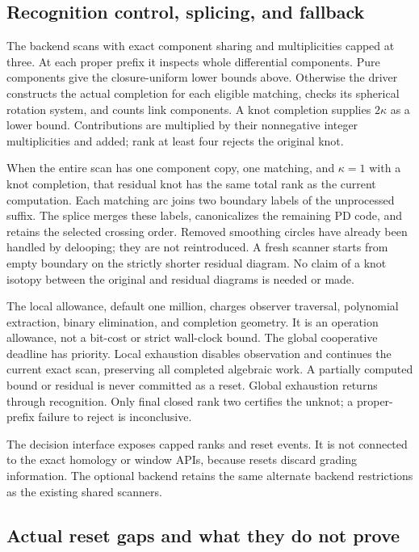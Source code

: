 \subsection{Recognition control, splicing, and fallback}

The backend scans with exact component sharing and multiplicities capped
at three.  At each proper prefix it inspects whole differential components.
Pure components give the closure-uniform lower bounds above.  Otherwise
the driver constructs the actual completion for each eligible matching,
checks its spherical rotation system, and counts link components.
A knot completion supplies $2\kappa$ as a lower bound.  Contributions
are multiplied by their nonnegative integer multiplicities and added;
rank at least four rejects the original knot.

When the entire scan has one component copy, one matching, and
$\kappa=1$ with a knot completion, that residual knot has the same total
rank as the current computation.  Each matching arc joins two boundary
labels of the unprocessed suffix.  The splice merges these labels,
canonicalizes the remaining PD code, and retains the selected crossing
order.  Removed smoothing circles have already been handled by delooping;
they are not reintroduced.  A fresh scanner starts from empty boundary on
the strictly shorter residual diagram.  No claim of a knot isotopy between
the original and residual diagrams is needed or made.

The local  allowance, default one million,
charges observer traversal, polynomial extraction, binary elimination,
and completion geometry.  It is an operation allowance, not a bit-cost
or strict wall-clock bound.  The global cooperative deadline has priority.
Local exhaustion disables observation and continues the current exact
scan, preserving all completed algebraic work.  A partially computed
bound or residual is never committed as a reset.  Global exhaustion
returns  through recognition.  Only final closed rank two
certifies the unknot; a proper-prefix failure to reject is inconclusive.

The decision interface exposes capped ranks and reset events.  It is not
connected to the exact homology or window APIs, because resets discard
grading information.  The optional backend retains the same alternate
backend restrictions as the existing shared scanners.

\subsection{Actual reset gaps and what they do not prove}

